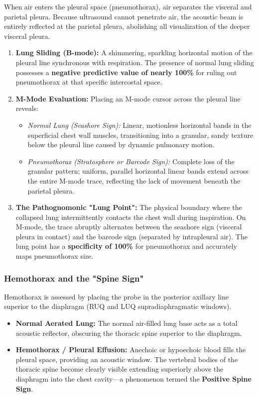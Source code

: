 \documentclass[11pt,a4paper]{article}
\begin{document}
When air enters the pleural space (pneumothorax), air separates the visceral and parietal pleura. Because ultrasound cannot penetrate air, the acoustic beam is entirely reflected at the parietal pleura, abolishing all visualization of the deeper visceral pleura.

\begin{physicsbox}
\begin{enumerate}[leftmargin=1.5em]
    \item \textbf{Lung Sliding (B-mode):} A shimmering, sparkling horizontal motion of the pleural line synchronous with respiration. The presence of normal lung sliding possesses a \textbf{negative predictive value of nearly 100\%} for ruling out pneumothorax at that specific intercostal space.
    \item \textbf{M-Mode Evaluation:} Placing an M-mode cursor across the pleural line reveals:
    \begin{itemize}
        \item \textit{Normal Lung (Seashore Sign):} Linear, motionless horizontal bands in the superficial chest wall muscles, transitioning into a granular, sandy texture below the pleural line caused by dynamic pulmonary motion.
        \item \textit{Pneumothorax (Stratosphere or Barcode Sign):} Complete loss of the granular pattern; uniform, parallel horizontal linear bands extend across the entire M-mode trace, reflecting the lack of movement beneath the parietal pleura.
    \end{itemize}
    \item \textbf{The Pathognomonic "Lung Point":} The physical boundary where the collapsed lung intermittently contacts the chest wall during inspiration. On M-mode, the trace abruptly alternates between the seashore sign (visceral pleura in contact) and the barcode sign (separated by intrapleural air). The lung point has a \textbf{specificity of 100\%} for pneumothorax and accurately maps pneumothorax size.
\end{enumerate}
\end{physicsbox}

\subsubsection{Hemothorax and the "Spine Sign"}
Hemothorax is assessed by placing the probe in the posterior axillary line superior to the diaphragm (RUQ and LUQ supradiaphragmatic windows).
\begin{itemize}[leftmargin=2em]
    \item \textbf{Normal Aerated Lung:} The normal air-filled lung base acts as a total acoustic reflector, obscuring the thoracic spine superior to the diaphragm.
    \item \textbf{Hemothorax / Pleural Effusion:} Anechoic or hypoechoic blood fills the pleural space, providing an acoustic window. The vertebral bodies of the thoracic spine become clearly visible extending superiorly above the diaphragm into the chest cavity—a phenomenon termed the \textbf{Positive Spine Sign}.
\end{itemize}
\end{document}
